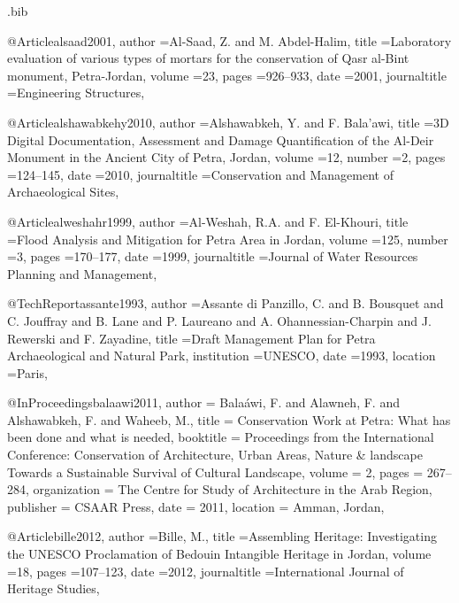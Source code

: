 \begin{filecontents}{\IJSRAidentifier.bib}

@Article{alsaad2001,
  author       ={Al-Saad, Z. and M. Abdel-Halim},
  title        ={Laboratory evaluation of various types of mortars for the conservation of Qasr al-Bint monument, Petra-Jordan},
  volume       ={23},
  pages        ={926--933},
  date         ={2001},
  journaltitle ={Engineering Structures},
}

@Article{alshawabkehy2010,
  author       ={Alshawabkeh, Y. and F. Bala’awi},
  title        ={3D Digital Documentation, Assessment and Damage Quantification of the Al-Deir Monument in the Ancient City of Petra, Jordan},
  volume       ={12},
  number       ={2},
  pages        ={124--145},
  date         ={2010},
  journaltitle ={Conservation and Management of Archaeological Sites},
}

@Article{alweshahr1999,
  author       ={Al-Weshah, R.A. and F. El-Khouri},
  title        ={Flood Analysis and Mitigation for Petra Area in Jordan},
  volume       ={125},
  number       ={3},
  pages        ={170--177},
  date         ={1999},
  journaltitle ={Journal of Water Resources Planning and Management},
}

@TechReport{assante1993,
  author      ={Assante di Panzillo, C. and B. Bousquet and C. Jouffray and B. Lane and P. Laureano and A. Ohannessian-Charpin and J. Rewerski and F. Zayadine},
  title       ={Draft Management Plan for Petra Archaeological and Natural Park},
  institution ={UNESCO},
  date        ={1993},
  location    ={Paris},
}

@InProceedings{balaawi2011,
  author       = {Balaáwi, F. and Alawneh, F. and Alshawabkeh, F. and Waheeb, M.},
  title        = {Conservation Work at Petra: What has been done and what is needed},
  booktitle    = {Proceedings from the International Conference: Conservation of Architecture, Urban Areas, Nature \& landscape Towards a Sustainable Survival of Cultural Landscape},
  volume       = {2},
  pages        = {267--284},
  organization = {The Centre for Study of Architecture in the Arab Region},
  publisher    = {CSAAR Press},
  date         = {2011},
  location     = {Amman, Jordan},
}

@Article{bille2012,
  author       ={Bille, M.},
  title        ={Assembling Heritage: Investigating the UNESCO Proclamation of Bedouin Intangible Heritage in Jordan},
  volume       ={18},
  pages        ={107--123},
  date         ={2012},
  journaltitle ={International Journal of Heritage Studies},
}


\end{filecontents}
